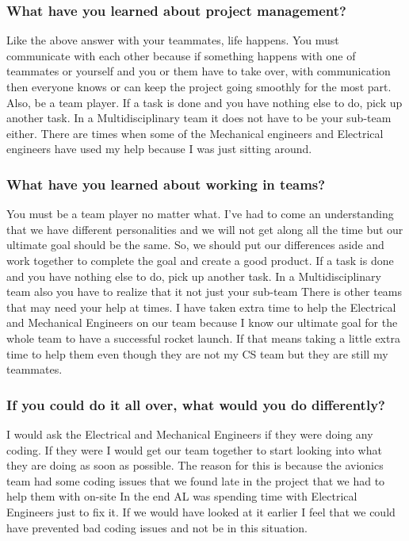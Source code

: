 \documentclass[10pt,draftclsnofoot,onecolumn]{IEEEtran}
\begin{document}
\subsubsection{What have you learned about project management?}
Like the above answer with your teammates, life happens.  You must communicate with each other because if something happens with one of teammates or yourself and you or them have to take over, with communication then everyone knows or can keep the project going smoothly for the most part.  Also, be a team player.  If a task is done and you have nothing else to do, pick up another task.  In a Multidisciplinary team it does not have to be your sub-team either.  There are times when some of the Mechanical engineers and Electrical engineers have used my help because I was just sitting around.   
\subsubsection{What have you learned about working in teams?}
You must be a team player no matter what.  I’ve had to come an understanding that we have different personalities and we will not get along all the time but our ultimate goal should be the same. So, we should put our differences aside and work together to complete the goal and create a good product.  If a task is done and you have nothing else to do, pick up another task.  In a Multidisciplinary team also you have to realize that it not just your sub-team  There is other teams that may need your help at times.  I have taken extra time to help the Electrical and Mechanical Engineers on our team because I know our ultimate goal for the whole team to have a successful rocket launch.  If that means taking a little extra time to help them even though they are not my CS team but they are still my teammates. 
\subsubsection{If you could do it all over, what would you do differently?}
I would ask the Electrical and Mechanical Engineers if they were doing any coding.  If they were I would get our team together to start looking into what they are doing as soon as possible.  The reason for this is because the avionics team had some coding issues that we found late in the project that we had to help them with on-site  In the end AL was spending time with Electrical Engineers just to fix it.  If we would have looked at it earlier I feel that we could have prevented bad coding issues and not be in this situation.
\end{document}

